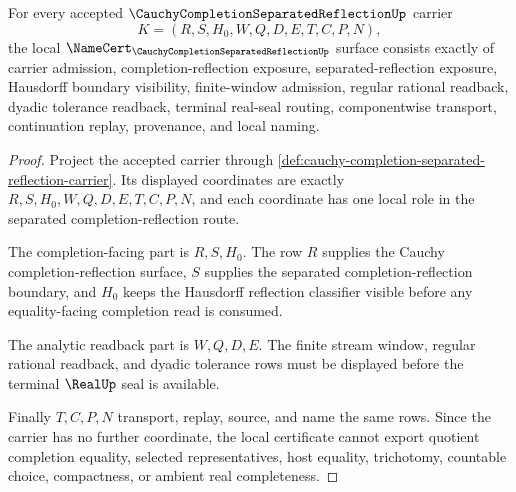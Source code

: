 \begin{theorem}
\label{thm:cauchy-completion-separated-reflection-namecert-obligations}
For every accepted $\CauchyCompletionSeparatedReflectionUp$ carrier
$$
K=(R,S,H_0,W,Q,D,E,T,C,P,N),
$$
the local $\NameCert_{\CauchyCompletionSeparatedReflectionUp}$ surface consists exactly of carrier admission, completion-reflection exposure, separated-reflection exposure, Hausdorff boundary visibility, finite-window admission, regular rational readback, dyadic tolerance readback, terminal real-seal routing, componentwise transport, continuation replay, provenance, and local naming.
\end{theorem}
\begin{proof}
Project the accepted carrier through \autoref{def:cauchy-completion-separated-reflection-carrier}. Its displayed coordinates are exactly $R,S,H_0,W,Q,D,E,T,C,P,N$, and each coordinate has one local role in the separated completion-reflection route.

The completion-facing part is $R,S,H_0$. The row $R$ supplies the Cauchy completion-reflection surface, $S$ supplies the separated completion-reflection boundary, and $H_0$ keeps the Hausdorff reflection classifier visible before any equality-facing completion read is consumed.

The analytic readback part is $W,Q,D,E$. The finite stream window, regular rational readback, and dyadic tolerance rows must be displayed before the terminal $\RealUp$ seal is available.

Finally $T,C,P,N$ transport, replay, source, and name the same rows. Since the carrier has no further coordinate, the local certificate cannot export quotient completion equality, selected representatives, host equality, trichotomy, countable choice, compactness, or ambient real completeness.
\end{proof}

